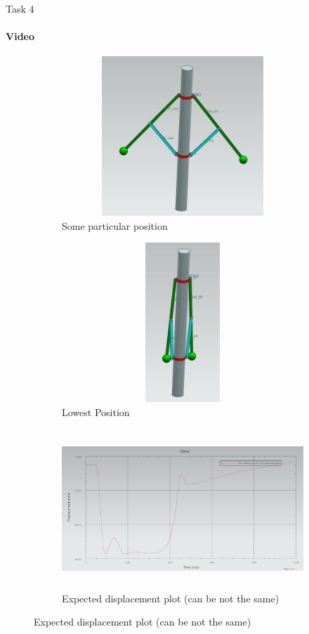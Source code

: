 \documentclass[aspectratio=169]{beamer}
\newcommand{\fbckg}[1]{\usebackgroundtemplate{\texttt{[image: \#1]}}}%
\begin{document}
\begin{frame}[t]{Task 4}
    \framesubtitle{Video}
    \vspace{-1cm}
    \begin{figure}[H]
        \begin{subfigure}{0.32\textwidth}
            \centering\includegraphics[height=6cm,width=1\textwidth,keepaspectratio]{4_1.jpg}
            \caption{Some particular position}
            \label{fig:4_1.jpg}
        \end{subfigure}
        \begin{subfigure}{0.22\textwidth}
            \centering\includegraphics[height=6cm,width=1\textwidth,keepaspectratio]{4_2.jpg}
            \caption{Lowest Position}
            \label{fig:4_2.jpg}
        \end{subfigure}
        \begin{subfigure}{0.42\textwidth}
            \centering\includegraphics[height=6cm,width=1\textwidth,keepaspectratio]{4_3.jpg}
            \caption{Expected displacement plot (can be not the same)}
            \label{fig:4_3.jpg}
        \end{subfigure}
    \end{figure}
\end{frame}

\fbckg{fibeamer/figs/last_page.png}
\frame[plain]{}
\end{document}
